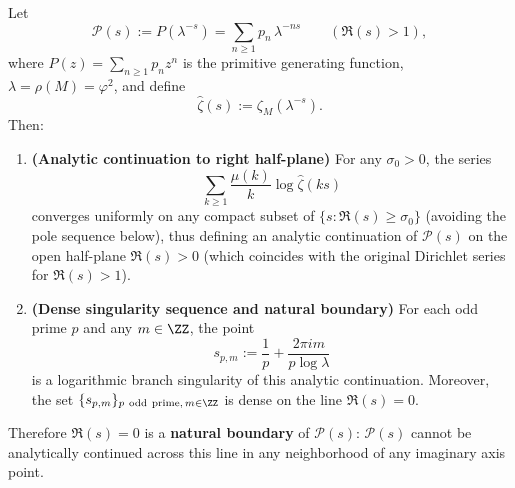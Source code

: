 \begin{theorem}[Natural boundary of primitive--Dirichlet series: \texorpdfstring{$\Re(s)=0$}{Re(s)=0}]\label{thm:real-input-40-primedirichlet-dense-branch}
Let
\[
\mathcal{P}(s):=P(\lambda^{-s})=\sum_{n\ge 1}p_n\,\lambda^{-ns}\qquad(\Re(s)>1),
\]
where $P(z)=\sum_{n\ge 1}p_n z^n$ is the primitive generating function, $\lambda=\rho(M)=\varphi^2$, and define
\[
\widehat{\zeta}(s):=\zeta_M(\lambda^{-s}).
\]
Then:
\begin{enumerate}
  \item \textbf{(Analytic continuation to right half-plane)} For any $\sigma_0>0$, the series
  \[
  \sum_{k\ge 1}\frac{\mu(k)}{k}\log \widehat{\zeta}(ks)
  \]
  converges uniformly on any compact subset of
  \(
  \{s:\Re(s)\ge \sigma_0\}
  \)
  (avoiding the pole sequence below), thus defining an analytic continuation of $\mathcal{P}(s)$ on the open half-plane $\Re(s)>0$ (which coincides with the original Dirichlet series for $\Re(s)>1$).
  \item \textbf{(Dense singularity sequence and natural boundary)} For each odd prime $p$ and any $m\in\ZZ$, the point
  \[
  s_{p,m}:=\frac{1}{p}+\frac{2\pi i m}{p\log\lambda}
  \]
  is a logarithmic branch singularity of this analytic continuation. Moreover, the set $\{s_{p,m}\}_{p\ \mathrm{odd\ prime},\,m\in\ZZ}$ is dense on the line $\Re(s)=0$.
\end{enumerate}
Therefore \(\Re(s)=0\) is a \textbf{natural boundary} of \(\mathcal{P}(s)\): \(\mathcal{P}(s)\) cannot be analytically continued across this line in any neighborhood of any imaginary axis point.
\end{theorem}

